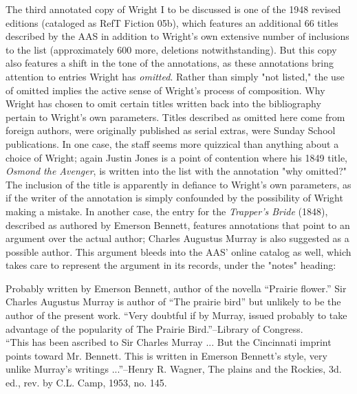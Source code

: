 The third annotated copy of Wright I to be discussed is one of the 1948 revised editions (cataloged as RefT Fiction 05b), which features an additional 66 titles described by the AAS in addition to Wright's own extensive number of inclusions to the list (approximately 600 more, deletions notwithstanding). But this copy also features a shift in the tone of the annotations, as these annotations bring attention to entries Wright has \textit{omitted}. Rather than simply "not listed," the use of omitted implies the active sense of Wright's process of composition. Why Wright has chosen to omit certain titles written back into the bibliography pertain to Wright's own parameters. Titles described as omitted here come from foreign authors, were originally published as serial extras, were Sunday School publications. In one case, the staff seems more quizzical than anything about a choice of Wright; again Justin Jones is a point of contention where his 1849 title, \textit{Osmond the Avenger}, is written into the list with the annotation "why omitted?" The inclusion of the title is apparently in defiance to Wright's own parameters, as if the writer of the annotation is simply confounded by the possibility of Wright making a mistake. In another case, the entry for the \textit{Trapper's Bride} (1848), described as authored by Emerson Bennett, features annotations that point to an argument over the actual author; Charles Augustus Murray is also suggested as a possible author. This argument bleeds into the AAS' online catalog as well, which takes care to represent the argument in its records, under the "notes" heading: 
\begin{displayquote}
Probably written by Emerson Bennett, author of the novella ``Prairie flower.'' Sir Charles Augustus Murray is author of ``The prairie bird'' but unlikely to be the author of the present work.
``Very doubtful if by Murray, issued probably to take advantage of the popularity of The Prairie Bird.''--Library of Congress.
\\
``This has been ascribed to Sir Charles Murray ... But the Cincinnati imprint points toward Mr. Bennett. This is written in Emerson Bennett's style, very unlike Murray's writings ...''--Henry R. Wagner, The plains and the Rockies, 3d. ed., rev. by C.L. Camp, 1953, no. 145.\autocite{bennett_trappers_1848}
\end{displayquote}

